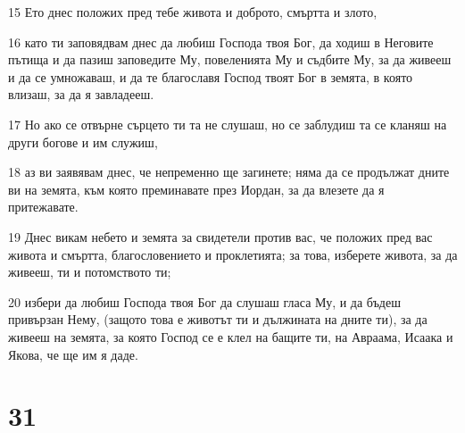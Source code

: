 \par 15 Ето днес положих пред тебе живота и доброто, смъртта и злото,
\par 16 като ти заповядвам днес да любиш Господа твоя Бог, да ходиш в Неговите пътища и да пазиш заповедите Му, повеленията Му и съдбите Му, за да живееш и да се умножаваш, и да те благославя Господ твоят Бог в земята, в която влизаш, за да я завладееш.
\par 17 Но ако се отвърне сърцето ти та не слушаш, но се заблудиш та се кланяш на други богове и им служиш,
\par 18 аз ви заявявам днес, че непременно ще загинете; няма да се продължат дните ви на земята, към която преминавате през Иордан, за да влезете да я притежавате.
\par 19 Днес викам небето и земята за свидетели против вас, че положих пред вас живота и смъртта, благословението и проклетията; за това, изберете живота, за да живееш, ти и потомството ти;
\par 20 избери да любиш Господа твоя Бог да слушаш гласа Му, и да бъдеш привързан Нему, (защото това е животът ти и дължината на дните ти), за да живееш на земята, за която Господ се е клел на бащите ти, на Авраама, Исаака и Якова, че ще им я даде.

\chapter{31}

